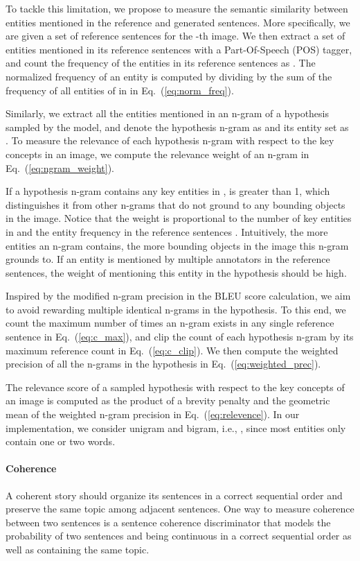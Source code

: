\documentclass[letterpaper]{article} \usepackage{aaai20}  \usepackage{times}  \usepackage{helvet} \usepackage{courier}  \usepackage[hyphens]{url}  \usepackage{graphicx} \urlstyle{rm} \def\UrlFont{\rm}  \usepackage{graphicx}  \frenchspacing  \setlength{\pdfpagewidth}{8.5in}  \setlength{\pdfpageheight}{11in}  \usepackage{times}
\begin{document}
To tackle this limitation, we propose to measure the semantic similarity between entities mentioned in the reference and generated sentences. More specifically, we are given a set of  reference sentences  for the -th image. We then extract a set of entities  mentioned in its reference sentences  with a Part-Of-Speech (POS) tagger, and count the frequency of the entities in its reference sentences as . The normalized frequency of an entity is computed by dividing by the sum of the frequency of all entities of in  in Eq.~(\ref{eq:norm_freq}). 

Similarly, we extract all the entities mentioned in an n-gram of a hypothesis  sampled by the model, and denote the hypothesis n-gram as  and its entity set as . To measure the relevance of each hypothesis n-gram with respect to the key concepts in an image, we compute the relevance weight of an n-gram in Eq.~(\ref{eq:ngram_weight}). 

If a hypothesis n-gram contains any key entities in ,  is greater than 1, which distinguishes it from other n-grams that do not ground to any bounding objects in the image. Notice that the weight is proportional to the number of key entities in  and the entity frequency in the reference sentences . Intuitively, the more entities an n-gram contains, the more bounding objects in the image this n-gram grounds to. If an entity is mentioned by multiple annotators in the reference sentences, the weight of mentioning this entity in the hypothesis should be high. 


Inspired by the modified n-gram precision in the BLEU score calculation, we aim to avoid rewarding multiple identical n-grams in the hypothesis. To this end, we count the maximum number of times an n-gram exists in any single reference sentence in Eq.~(\ref{eq:c_max}), and clip the count of each hypothesis n-gram by its maximum reference count in Eq.~(\ref{eq:c_clip}). We then compute the weighted precision of all the n-grams in the hypothesis  in Eq.~(\ref{eq:weighted_prec}).

 The relevance score of a sampled hypothesis with respect to the key concepts of an image is computed as the product of a brevity penalty and the geometric mean of the weighted n-gram precision in Eq.~(\ref{eq:relevence}). In our implementation, we consider unigram and bigram, i.e., , since most entities only contain one or two words.



\paragraph{Coherence}
A coherent story should organize its sentences in a correct sequential order and preserve the same topic among adjacent sentences. One way to measure coherence between two sentences is a sentence coherence discriminator that models the probability of two sentences  and  being continuous in a correct sequential order as well as containing the same topic. 
\end{document}
